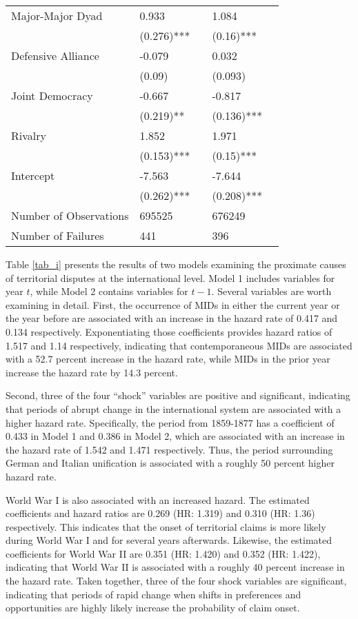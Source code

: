 \begin{table}[htpb]
\begin{tabular}{lllll}
		Major-Major Dyad & 0.933 &  & 1.084 &  \\ 
		& (0.276)*** &  & (0.16)*** &  \\ 
		Defensive Alliance & -0.079 &  & 0.032 &  \\ 
		& (0.09)  &  & (0.093)  &  \\ 
		Joint Democracy & -0.667 &  & -0.817 &  \\ 
		& (0.219)** &  & (0.136)*** &  \\ 
		Rivalry & 1.852 &  & 1.971 &  \\ 
		& (0.153)*** &  & (0.15)*** &  \\ 
		Intercept & -7.563 &  & -7.644 &  \\ 
		& (0.262)*** &  & (0.208)*** &  \\ 
		Number of Observations & 695525 &  & 676249 &  \\ 
		Number of Failures & 441 &  & 396 &  \\ 
		\hline
	\end{tabular}
\end{table}

Table \ref{tab_i} presents the results of two models examining the proximate causes of territorial disputes at the international level. Model 1 includes variables for year $t$, while Model 2 contains variables for $t-1$. Several variables are worth examining in detail. First, the occurrence of MIDs in either the current year or the year before are associated with an increase in the hazard rate of 0.417 and 0.134 respectively. Exponentiating those coefficients provides hazard ratios of 1.517 and 1.14 respectively, indicating that contemporaneous MIDs are associated with a 52.7 percent increase in the hazard rate, while MIDs in the prior year increase the hazard rate by 14.3 percent.

Second, three of the four ``shock'' variables are positive and significant, indicating that periods of abrupt change in the international system are associated with a higher hazard rate. Specifically, the period from 1859-1877 has a coefficient of 0.433 in Model 1 and 0.386 in Model 2, which are associated with an increase in the hazard rate of 1.542 and 1.471 respectively. Thus, the period surrounding German and Italian unification is associated with a roughly 50 percent higher hazard rate. 

World War I is also associated with an increased hazard. The estimated coefficients and hazard ratios are 0.269 (HR: 1.319) and 0.310 (HR: 1.36) respectively. This indicates that the onset of territorial claims is more likely during World War I and for several years afterwards. Likewise, the estimated coefficients for World War II are 0.351 (HR: 1.420) and 0.352 (HR: 1.422), indicating that World War II is associated with a roughly 40 percent increase in the hazard rate. Taken together, three of the four shock variables are significant, indicating that periods of rapid change when shifts in preferences and opportunities are highly likely increase the probability of claim onset.


